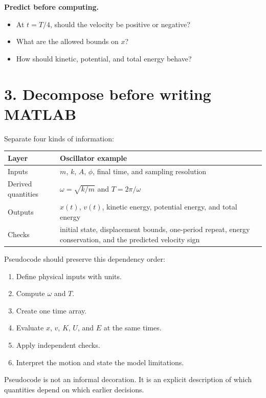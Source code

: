 \documentclass[11pt,a4paper]{article}
\begin{document}
\begin{checkbox}
\textbf{Predict before computing.}
\begin{itemize}[nosep,leftmargin=5mm]
  \item At $t=T/4$, should the velocity be positive or negative?
  \item What are the allowed bounds on $x$?
  \item How should kinetic, potential, and total energy behave?
\end{itemize}
\end{checkbox}

\section*{3. Decompose before writing MATLAB}
Separate four kinds of information:
\begin{center}
\small
\begin{tabular}{>{\raggedright\arraybackslash}p{.20\linewidth}>{\raggedright\arraybackslash}p{.68\linewidth}}
\toprule
\textbf{Layer} & \textbf{Oscillator example}\\ \midrule
Inputs & $m$, $k$, $A$, $\phi$, final time, and sampling resolution\\
Derived quantities & $\omega=\sqrt{k/m}$ and $T=2\pi/\omega$\\
Outputs & $x(t)$, $v(t)$, kinetic energy, potential energy, and total energy\\
Checks & initial state, displacement bounds, one-period repeat, energy conservation, and the predicted velocity sign\\ \bottomrule
\end{tabular}
\end{center}

Pseudocode should preserve this dependency order:
\begin{enumerate}[nosep,leftmargin=6mm]
  \item Define physical inputs with units.
  \item Compute $\omega$ and $T$.
  \item Create one time array.
  \item Evaluate $x$, $v$, $K$, $U$, and $E$ at the same times.
  \item Apply independent checks.
  \item Interpret the motion and state the model limitations.
\end{enumerate}

Pseudocode is not an informal decoration. It is an explicit description of which quantities depend on which earlier decisions.
\end{document}
